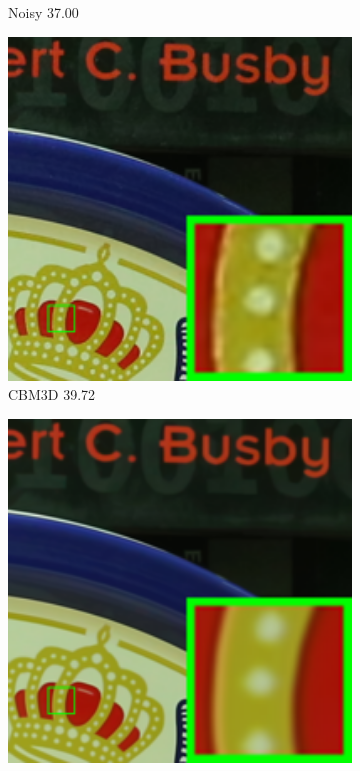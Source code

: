 \begin{figure}
\begin{subfigure}[t]{0.19\textwidth}
		\caption{Noisy 37.00}
    \end{subfigure}
    \hfill
    \begin{subfigure}[t]{0.19\textwidth}
        \centering
        \includegraphics[width=1\textwidth]{images/twsc/cc/resize_br_CBM3D_5dmark3_iso3200_1_real.png}
		\caption{CBM3D 39.72}
    \end{subfigure}
    \hfill
    \begin{subfigure}[t]{0.19\textwidth}
        \centering
        \includegraphics[width=1\textwidth]{images/twsc/cc/resize_br_WNNM_5dmark3_iso3200_1_real.png}

\end{subfigure}
\end{figure}

